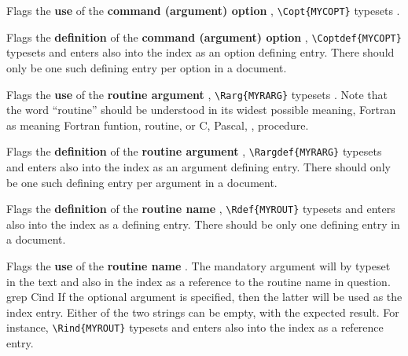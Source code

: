 
Flags the \textbf{use} of the \textbf{command (argument) option} ,
\eg \verb!\Copt{MYCOPT}! typesets .


Flags the \textbf{definition} of the \textbf{command (argument) option} 
,
\eg \verb!\Coptdef{MYCOPT}! typesets  and enters 
also into the index as an option defining entry. 
There should only be one such defining entry per option in a document.



Flags the \textbf{use} of the \textbf{routine argument} ,
\eg \verb!\Rarg{MYRARG}! typesets .
Note that the word ``routine'' should be understood
in its widest possible meaning, \ie Fortran as meaning Fortran funtion, routine,
or C, Pascal, \etc, procedure.


Flags the \textbf{definition} of the \textbf{routine argument} 
,
\eg \verb!\Rargdef{MYRARG}! typesets  and enters 
also into the index as an argument defining entry. 
There should only be one such defining entry per argument in a document.


Flags the \textbf{definition} of the \textbf{routine name} ,
\eg \verb!\Rdef{MYROUT}! typesets  and enters 
also into the index as a defining entry. There should be only 
one defining entry in a document.


Flags the \textbf{use} of the \textbf{routine name} .
The mandatory argument  will by typeset in the text and also in 
the index as a reference to the routine name in question. 
grep Cind If the optional argument 
is specified, then the latter will be used as the index entry.
Either of the two strings can be empty, with the expected result.
For instance, \verb!\Rind{MYROUT}! typesets  
and enters  also into the index as a reference entry.


